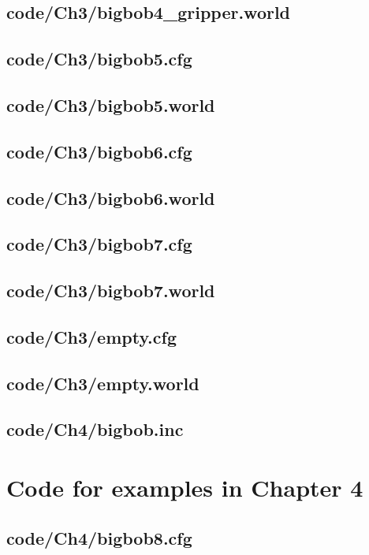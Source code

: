 \documentclass[a4paper]{report}
\begin{document}
{\section{code/Ch3/bigbob4\_gripper.world}

\section{code/Ch3/bigbob5.cfg}

\section{code/Ch3/bigbob5.world}

\section{code/Ch3/bigbob6.cfg}

\section{code/Ch3/bigbob6.world}

\section{code/Ch3/bigbob7.cfg}

\section{code/Ch3/bigbob7.world}

\section{code/Ch3/empty.cfg}

\section{code/Ch3/empty.world}

\section{code/Ch4/bigbob.inc}
\chapter{Code for examples in Chapter 4}

\section{code/Ch4/bigbob8.cfg}

}
\end{document}
